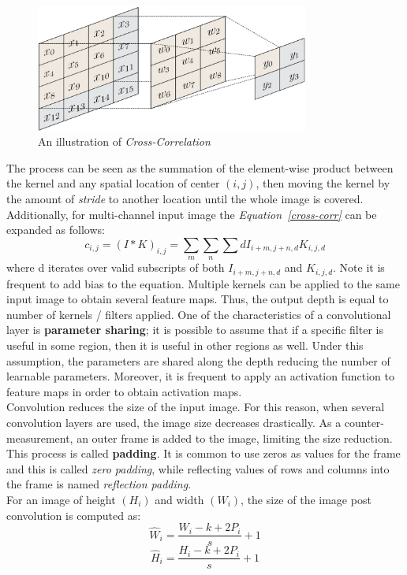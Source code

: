 \documentclass[12pt]{extarticle}
\begin{document}
	\begin{figure}[h]
		\centering
		\includegraphics[width=0.8\textwidth]{pics/Figures/convolution.png}
		\caption{\small{An illustration of \emph{Cross-Correlation}}}
		\label{fig:cross-corr}
	\end{figure}
	The process can be seen as the summation of the element-wise product between the kernel and any spatial location of center $(i, j)$, then moving the kernel by the amount of \emph{stride }to another location until the whole image is covered. Additionally, for multi-channel input image the \emph{Equation~\ref{cross-corr}} can be expanded as follows:
	\begin{equation}
		c_{i,j} = (I*K)_{i,j} = \sum_{m}\sum_{n}\sum{d}I_{i+m,j+n,d}K_{i,j,d}
	\end{equation}
	where d iterates over valid subscripts of both $I_{i+m,j+n,d}$ and $K_{i,j,d}$. Note it is frequent to add bias to the equation. Multiple kernels can be applied to the same input image to obtain several feature maps. Thus, the output depth is equal to number of kernels / filters applied. One of the characteristics of a convolutional layer is \textbf{parameter sharing}; it is possible to assume that if a specific filter is useful in some region, then it is useful in other regions as well. Under this assumption, the parameters are shared along the depth \cite{par_share} reducing the number of learnable parameters. Moreover, it is frequent to apply an activation function to feature maps in order to obtain activation maps.
\\[5mm]
	Convolution reduces the size of the input image. For this reason, when several convolution layers are used, the image size decreases drastically. As a counter-measurement, an outer frame is added to the image, limiting the size reduction. This process is called \textbf{padding}. It is common to use zeros as values for the frame and this is called \emph{zero padding}, while reflecting values of rows and columns into the frame is named \emph{reflection padding}.\\[5mm]
	For an image of height $(H_i)$ and width $(W_i)$, the size of the image post convolution is computed as:
	\begin{equation}\label{width}
		\hat{W}_i = \dfrac{W_i-k+2P_i}{s}+1
	\end{equation}
	\begin{equation}\label{height}
		\hat{H}_i = \dfrac{H_i-k+2P_i}{s}+1
	\end{equation}
\end{document}
